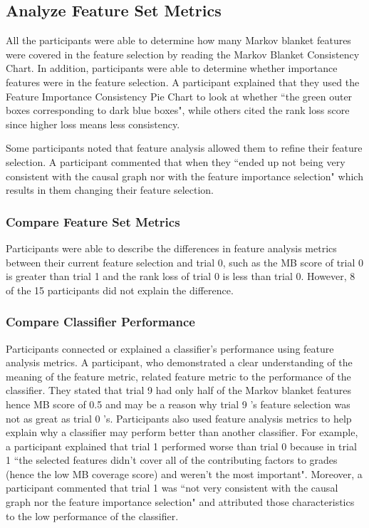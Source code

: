 \subsection { Analyze Feature Set Metrics }
All the participants were able to determine how many Markov blanket features were covered in the feature selection by reading the Markov Blanket Consistency Chart. In addition, participants were able to determine whether importance features were in the feature selection. A participant explained that they used the Feature Importance Consistency Pie Chart to look at whether ``the green outer boxes corresponding to dark blue boxes", while others cited the rank loss score since higher loss means less consistency.

Some participants noted that feature analysis allowed them to refine their feature selection. A participant commented that when they ``ended up not being very consistent with the causal graph nor with the feature importance selection" which results in them changing their feature selection.

\subsubsection { Compare Feature Set Metrics }
Participants were able to describe the differences in feature analysis metrics between their current feature selection and trial 0, such as the MB score of trial 0 is greater than trial 1 and the rank loss of trial 0 is less than trial 0. However, 8 of the 15 participants did not explain the difference.

\subsubsection { Compare Classifier Performance }
Participants connected or explained a classifier's performance using feature analysis metrics. A participant, who demonstrated a clear understanding of the meaning of the feature metric, related feature metric to the performance of the classifier. They stated that trial 9 had only half of the Markov blanket features hence MB score of 0.5 and may be a reason why trial 9 's feature selection was not as great as trial 0 ’s.
Participants also used feature analysis metrics to help explain why a classifier may perform better than another classifier. For example, a participant explained that trial 1 performed worse than trial 0 because in trial 1 ``the selected features didn't cover all of the contributing factors to grades (hence the low MB coverage score) and weren't the most important". Moreover, a participant commented that trial 1 was ``not very consistent with the causal graph nor the feature importance selection" and attributed those characteristics to the low performance of the classifier.

